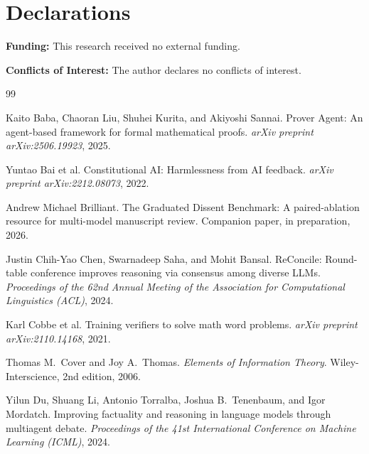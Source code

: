 \documentclass[11pt]{article}
\begin{document}
\section*{Declarations}

\textbf{Funding:} This research received no external funding.

\textbf{Conflicts of Interest:} The author declares no conflicts of interest.


\begin{thebibliography}{99}

Kaito Baba, Chaoran Liu, Shuhei Kurita, and Akiyoshi Sannai.
\newblock Prover Agent: An agent-based framework for formal mathematical proofs.
\newblock \emph{arXiv preprint arXiv:2506.19923}, 2025.

Yuntao Bai et al.
\newblock Constitutional {AI}: Harmlessness from {AI} feedback.
\newblock \emph{arXiv preprint arXiv:2212.08073}, 2022.

Andrew Michael Brilliant.
\newblock The Graduated Dissent Benchmark: A paired-ablation resource for multi-model manuscript review.
\newblock Companion paper, in preparation, 2026.

Justin Chih-Yao Chen, Swarnadeep Saha, and Mohit Bansal.
\newblock ReConcile: Round-table conference improves reasoning via consensus among diverse {LLMs}.
\newblock \emph{Proceedings of the 62nd Annual Meeting of the Association for Computational Linguistics (ACL)}, 2024.

Karl Cobbe et al.
\newblock Training verifiers to solve math word problems.
\newblock \emph{arXiv preprint arXiv:2110.14168}, 2021.

Thomas M.\ Cover and Joy A.\ Thomas.
\newblock \emph{Elements of Information Theory}.
\newblock Wiley-Interscience, 2nd edition, 2006.

Yilun Du, Shuang Li, Antonio Torralba, Joshua B.\ Tenenbaum, and Igor Mordatch.
\newblock Improving factuality and reasoning in language models through multiagent debate.
\newblock \emph{Proceedings of the 41st International Conference on Machine Learning (ICML)}, 2024.


\end{thebibliography}
\end{document}
